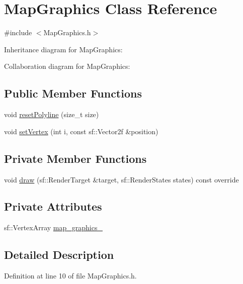 \hypertarget{classMapGraphics}{}\section{Map\+Graphics Class Reference}
\label{classMapGraphics}


{\ttfamily \#include $<$Map\+Graphics.\+h$>$}



Inheritance diagram for Map\+Graphics\+:


Collaboration diagram for Map\+Graphics\+:
\subsection*{Public Member Functions}
\begin{DoxyCompactItemize}
\item 
void \hyperlink{classMapGraphics_a389137596a79ed6a8239fe5451f8f470}{reset\+Polyline} (size\+\_\+t size)
\item 
void \hyperlink{classMapGraphics_a0d58d85db2e9d6e62623ebab6ffa11e9}{set\+Vertex} (int i, const sf\+::\+Vector2f \&position)
\end{DoxyCompactItemize}
\subsection*{Private Member Functions}
\begin{DoxyCompactItemize}
\item 
void \hyperlink{classMapGraphics_a6bd8a1174e0f56edb00def916a096e3c}{draw} (sf\+::\+Render\+Target \&target, sf\+::\+Render\+States states) const override
\end{DoxyCompactItemize}
\subsection*{Private Attributes}
\begin{DoxyCompactItemize}
\item 
sf\+::\+Vertex\+Array \hyperlink{classMapGraphics_a2136d586176f0c3a008182ff3fba50e3}{map\+\_\+graphics\+\_\+}
\end{DoxyCompactItemize}


\subsection{Detailed Description}


Definition at line 10 of file Map\+Graphics.\+h.



